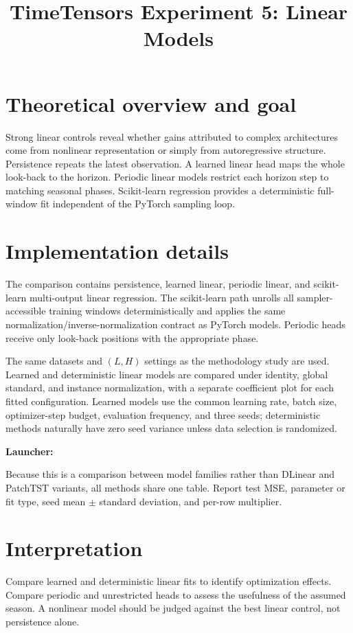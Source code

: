 \documentclass[10pt]{article}
\title{TimeTensors Experiment 5: Linear Models}
\author{}
\date{}
\begin{document}
\maketitle
\section{Theoretical overview and goal}
Strong linear controls reveal whether gains attributed to complex architectures
come from nonlinear representation or simply from autoregressive structure.
Persistence repeats the latest observation.  A learned linear head maps the
whole look-back to the horizon.  Periodic linear models restrict each horizon
step to matching seasonal phases.  Scikit-learn regression provides a
deterministic full-window fit independent of the PyTorch sampling loop.


\section{Implementation details}
The comparison contains persistence, learned linear, periodic linear, and
scikit-learn multi-output linear regression.  The scikit-learn path unrolls all
sampler-accessible training windows deterministically and applies the same
normalization/inverse-normalization contract as PyTorch models.  Periodic heads
receive only look-back positions with the appropriate phase.

The same datasets and $(L,H)$ settings as the methodology study are used.
Learned and deterministic linear models are compared under identity, global
standard, and instance normalization, with a separate coefficient plot for
each fitted configuration. Learned models use the common learning rate, batch
size, optimizer-step budget, evaluation frequency, and three seeds;
deterministic methods naturally have zero seed variance unless data selection
is randomized.

\textbf{Launcher:} 

Because this is a comparison between model families rather than DLinear and
PatchTST variants, all methods share one table.  Report test MSE, parameter or
fit type, seed mean $\pm$ standard deviation, and per-row multiplier.

\section{Interpretation}
Compare learned and deterministic linear fits to identify optimization effects.
Compare periodic and unrestricted heads to assess the usefulness of the assumed
season.  A nonlinear model should be judged against the best linear control,
not persistence alone.
\end{document}

